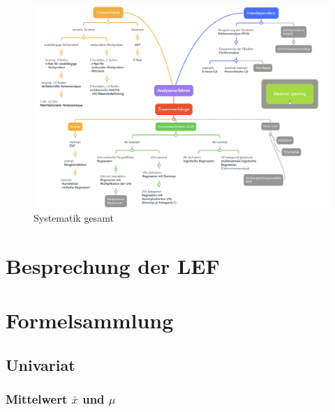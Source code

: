 \documentclass[
  10pt,
  letterpaper,
  a4paper, twoside]{scrreprt}
\begin{document}
\begin{figure}[H]

{\centering \includegraphics[width=1\textwidth,height=\textheight]{images/Analyseschema-total2.png}

}

\caption{Systematik gesamt}

\end{figure}%


\chapter{Besprechung der LEF}\label{sec-LEF}


\chapter*{Formelsammlung}\label{formelsammlung}


\section*{Univariat}\label{univariat}


\subsection*{\texorpdfstring{Mittelwert \(\bar{x}\) und
\(\mu\)}{Mittelwert \textbackslash bar\{x\} und \textbackslash mu}}\label{mittelwert-barx-und-mu}
\end{document}
